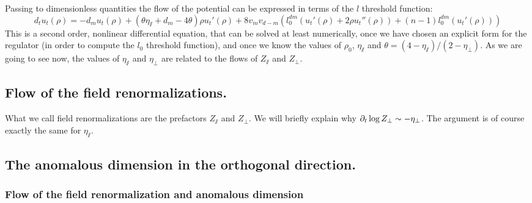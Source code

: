 Passing to dimensionless quantities the flow of the potential can be expressed in terms of the $l$ threshold function:
\begin{equation}
\label{eq:flow_u}
d_t u_t(\rho) = -d_m u_t(\rho) +(\theta \eta_\sslash + d_m - 4 \theta) \rho u_t'(\rho) + 8 v_m v_{d-m} \left( l_0^{dm}\left(u_t'(\rho) + 2 \rho u_t''(\rho) \right) + (n-1)l_0^{dm}\left(u_t'(\rho)\right) \right)
\end{equation}
This is a second order, nonlinear differential equation, that can be solved at least numerically, once we have chosen an explicit form for the regulator (in order to compute the $l_0$ threshold function), and once we know the values of $\rho_0$, $\eta_\sslash$ and $\theta = (4-\eta_\sslash)/(2-\eta_\perp)$. As we are going to see now, the values of $\eta_\sslash$ and $\eta_\perp$ are related to the flows of $Z_\sslash$ and $Z_\perp$.

\subsection{Flow of the field renormalizations.}

What we call field renormalizations are the prefactors $Z_\sslash$ and $Z_\perp$. We will briefly explain why $\partial_{t} \log Z_\perp \sim - \eta_\perp$. The argument is of course exactly the same for $\eta_\sslash$. 

\subsection{The anomalous dimension in the orthogonal direction.}

\subsubsection{Flow of the field renormalization and anomalous dimension}

